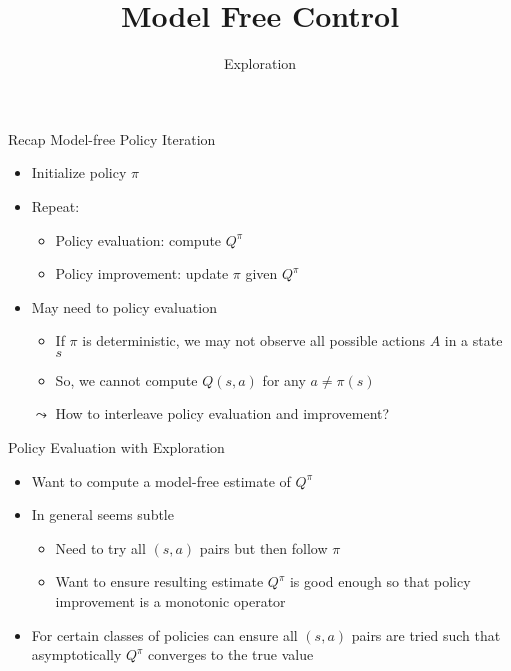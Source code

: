 


\title[Reinforcement Learning: Model Free Control]{Model Free Control}
\subtitle{Exploration}




	
	\maketitle

\begin{frame}[c]{Recap Model-free Policy Iteration}
	
	\begin{itemize}
		\item Initialize policy $\pi$
		\item Repeat:
		\begin{itemize}
			\item Policy evaluation: compute $Q^\pi$
			\item Policy improvement: update $\pi$ given $Q^\pi$
		\end{itemize}
		\bigskip
		\pause
		\item May need to policy evaluation 
		\begin{itemize}
			\item If $\pi$ is deterministic, we may not observe all possible actions $A$ in a state $s$
			\item So, we cannot compute $Q(s,a)$ for any $a \neq \pi(s)$
		\end{itemize}
		\pause
		\item[$\leadsto$] How to interleave policy evaluation and improvement?
	\end{itemize}
	
\end{frame}
\begin{frame}[c]{Policy Evaluation with Exploration}
	
	\begin{itemize}
		\item Want to compute a model-free estimate of $Q^\pi$
		\item In general seems subtle
		\begin{itemize}
			\item Need to try all $(s,a)$ pairs but then follow $\pi$
			\item Want to ensure resulting estimate $Q^\pi$ is good enough so that policy
			improvement is a monotonic operator
		\end{itemize}
		\item For certain classes of policies can ensure all $(s,a)$ pairs are tried such
		that asymptotically $Q^\pi$ converges to the true value
	\end{itemize}
	
\end{frame}
